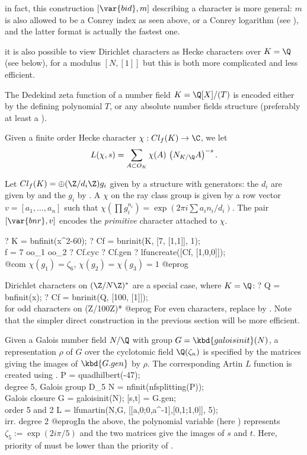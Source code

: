 \item in fact, this construction $[\var{bid}, m]$ describing a character
is more general: $m$ is also allowed to be a Conrey index as seen above,
or a Conrey logarithm (see ), and the latter format is
actually the fastest one.

\item it is also possible to view Dirichlet characters as Hecke characters
over $K = \Q$ (see below), for a modulus $[N, [1]]$ but this is both more
complicated and less efficient.


The Dedekind zeta function of a number field $K = \Q[X]/(T)$ is encoded
either by the defining polynomial $T$, or any absolute number fields
structure (preferably at least a ).

Given a finite order Hecke character $\chi: Cl_f(K)\to \C$, we let
$$L(\chi, s) = \sum_{A \subset O_K} \chi(A)\, \left(N_{K/\Q}A\right)^{-s}.$$

Let $Cl_f(K) = \oplus (\Z/d_i\Z) g_i$ given by a  structure with
generators: the $d_i$ are given by  and the $g_i$ by .
A  $\chi$ on the ray class group is given by a row vector
$v = [a_1,\ldots,a_n]$ such that $\chi(\prod g_i^{n_i}) = \exp(2\pi i\sum
a_i n_i / d_i)$. The pair $[\var{bnr}, v]$ encodes the \emph{primitive}
character attached to $\chi$.

\bprog
? K  = bnfinit(x^2-60);
? Cf = bnrinit(K, [7, [1,1]], 1); \\ f = 7 oo_1 oo_2
? Cf.cyc
? Cf.gen
? lfuncreate([Cf, [1,0,0]]); \\@com $\chi(g_1) = \zeta_6$, $\chi(g_2)=\chi(g_3)=1$
@eprog

\noindent Dirichlet characters on $(\Z/N\Z)^*$ are a special case,
where $K = \Q$:
\bprog
? Q  = bnfinit(x);
? Cf = bnrinit(Q, [100, [1]]); \\ for odd characters on (Z/100Z)*
@eprog\noindent
For even characters, replace by . Note that the simpler
direct construction in the previous section will be more efficient.


Given a Galois number field $N/\Q$ with group $G = \kbd{galoisinit}(N)$,
a representation $\rho$ of $G$ over the cyclotomic field $\Q(\zeta_n)$
is specified by the matrices giving the images of $\kbd{G.gen}$ by $\rho$.
The corresponding Artin $L$ function is created using .
\bprog
   P = quadhilbert(-47); \\  degree 5, Galois group D_5
   N = nfinit(nfsplitting(P)); \\ Galois closure
   G = galoisinit(N);
   [s,t] = G.gen; \\ order 5 and 2
   L = lfunartin(N,G, [[a,0;0,a^-1],[0,1;1,0]], 5); \\ irr. degree 2
@eprog\noindent In the above, the polynomial variable (here ) represents
$\zeta_5 := \exp(2i\pi/5)$ and the two matrices give the images of
$s$ and $t$. Here, priority of  must be lower than the priority
of .

